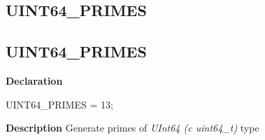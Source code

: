 \documentclass{report}
\newif\ifpdf
\begin{document}
\subsection*{\large{\textbf{UINT64{\_}PRIMES}}\normalsize\hspace{1ex}\hrulefill}
\else
\subsection*{UINT64{\_}PRIMES}
\fi
\label{primesieve-UINT64_PRIMES}
\begin{list}{}{
\setlength{\itemindent}{0cm}
\setlength{\listparindent}{0cm}
\setlength{\leftmargin}{\evensidemargin}
\addtolength{\leftmargin}{\tmplength}
\settowidth{\labelsep}{X}
\addtolength{\leftmargin}{\labelsep}
\setlength{\labelwidth}{\tmplength}
}
\item[\textbf{Declaration}\hfill]
\ifpdf
\begin{flushleft}
\fi
\begin{ttfamily}
UINT64{\_}PRIMES = 13;\end{ttfamily}

\ifpdf
\end{flushleft}
\fi

\par
\item[\textbf{Description}]
Generate primes of \textit{UInt64 (c uint64{\_}t)} type

\end{list}
\end{document}
